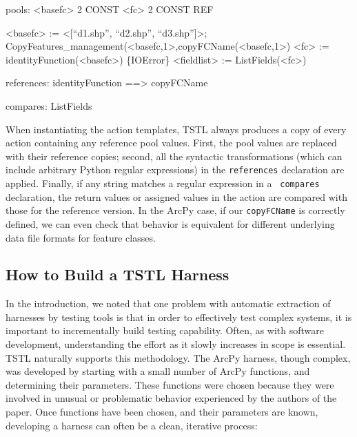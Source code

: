 {\scriptsize
\begin{code}
pools:
  <basefc> 2 CONST
  <fc> 2 CONST REF

<basefc> := <[``d1.shp'', ``d2.shp'', ``d3.shp'']>; \\
  CopyFeatures\_management(<basefc,1>,copyFCName(<basefc,1>)
<fc> := identityFunction(<basefc>)
\{IOError\} <fieldlist> := ListFields(<fc>)

references:
  identityFunction ==> copyFCName

compares:
  ListFields
\end{code}
}

When instantiating the action templates, TSTL always produces a copy
of every action containing any reference pool values.  First, the pool
values are replaced with their reference copies; second, all the
syntactic transformations (which can include arbitrary Python regular
expressions) in the {\tt references} declaration are applied.
Finally, if any string matches a regular expression in a {\tt
  compares} declaration, the return values or assigned values in the
action are compared with those for the reference version.  In the
ArcPy case, if our {\tt copyFCName} is correctly defined, we can even
check that behavior is equivalent for different underlying data file
formats for feature classes.

\subsection{How to Build a TSTL Harness}

In the introduction, we noted that one problem with automatic
extraction of harnesses by testing tools is that in order to effectively test
complex systems, it is important to incrementally build testing
capability.  Often, as with software development, understanding the
effort as it slowly increases in scope is essential.  TSTL
naturally supports this methodology.  The ArcPy harness, though
complex, was developed by starting with a small number of ArcPy
functions, and determining their parameters.  These functions were
chosen because they were involved in unusual or problematic behavior
experienced by the authors of the paper.  Once
functions have been chosen, and their parameters are known,
developing a harness can often be a clean, iterative process:

